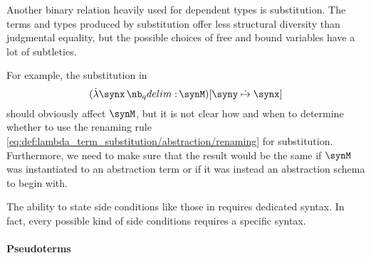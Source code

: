 \begin{remark}
\begin{thmenum}
     Another binary relation heavily used for dependent types is substitution. The terms and types produced by substitution offer less structural diversity than judgmental equality, but the possible choices of free and bound variables have a lot of subtleties.

    For example, the substitution in
    \begin{equation*}
      (\qabs \synx \synM)[\syny \mathrel{\syn\mapsto} \synx]
    \end{equation*}
    should obviously affect \( \synM \), but it is not clear how and when to determine whether to use the renaming rule \eqref{eq:def:lambda_term_substitution/abstraction/renaming} for substitution. Furthermore, we need to make sure that the result would be the same if \( \synM \) was instantiated to an abstraction term or if it was instead an abstraction schema to begin with.

     The ability to state side conditions like those in  requires dedicated syntax. In fact, every possible kind of side conditions requires a specific syntax.
  \end{thmenum}
\end{remark}

\paragraph{Pseudoterms}

